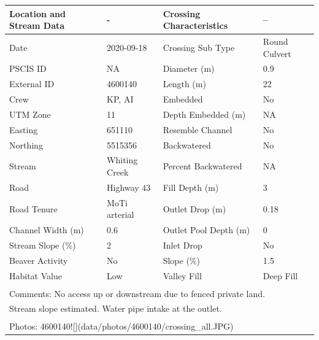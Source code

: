 \documentclass[
]{book}
\begin{document}
\begin{tabular}{llll}
\toprule
Location and Stream Data & - & Crossing Characteristics & --\\
\midrule
Date & 2020-09-18 & Crossing Sub Type & Round Culvert\\
PSCIS ID & NA & Diameter (m) & 0.9\\
External ID & 4600140 & Length (m) & 22\\
Crew & KP, AI & Embedded & No\\
UTM Zone & 11 & Depth Embedded (m) & NA\\
\addlinespace
Easting & 651110 & Resemble Channel & No\\
Northing & 5515356 & Backwatered & No\\
Stream & Whiting Creek & Percent Backwatered & NA\\
Road & Highway 43 & Fill Depth (m) & 3\\
Road Tenure & MoTi arterial & Outlet Drop (m) & 0.18\\
\addlinespace
Channel Width (m) & 0.6 & Outlet Pool Depth (m) & 0\\
Stream Slope (\%) & 2 & Inlet Drop & No\\
Beaver Activity & No & Slope (\%) & 1.5\\
Habitat Value & Low & Valley Fill & Deep Fill\\
\bottomrule
\multicolumn{4}{l}{\textsuperscript{} Comments: No access up or downstream due to fenced private land.}\\
\multicolumn{4}{l}{Stream slope estimated. Water pipe intake at the outlet.}\\
\multicolumn{4}{l}{\textsuperscript{} Photos: 4600140![](data/photos/4600140/crossing\_all.JPG)}\\
\end{tabular}
\end{document}
